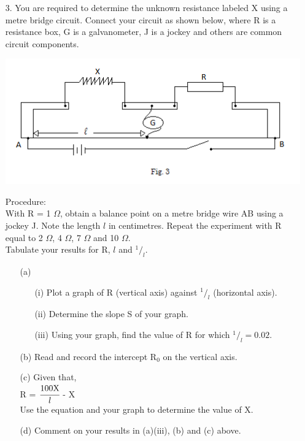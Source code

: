 \begin{enumerate}
\item[3.] You are required to determine the unknown resistance labeled X using a metre bridge circuit. Connect your circuit as shown below, where R is a resistance box, G is a galvanometer, J is a jockey and others are common circuit components.

\begin{center}
\includegraphics[width=14cm]{./img/2006-3-alt.png}
\end{center}

Procedure:\\

With R = 1 $\Omega$, obtain a balance point on a metre bridge wire AB using a jockey J. Note the length $l$ in centimetres. Repeat the experiment with R equal to 2 $\Omega$, 4 $\Omega$, 7 $\Omega$ and 10 $\Omega$.\\

Tabulate your results for R, $l$ and $^1/_l$.

\begin{itemize}
\item[(a)]
\begin{itemize}
\item[(i)] Plot a graph of R (vertical axis) against $^1/_l$ (horizontal axis).
\item[(ii)] Determine the slope S of your graph.
\item[(iii)] Using your graph, find the value of R for which $^1/_l = 0.02$.
\end{itemize}
\item[(b)] Read and record the intercept R$_0$ on the vertical axis.
\item[(c)] Given that,\\
\quad \quad R = $\cfrac{100\text{X}}{l}$ - X\\
Use the equation and your graph to determine the value of X.
\item[(d)] Comment on your results in (a)(iii), (b) and (c) above.
\end{itemize}

\end{enumerate}
